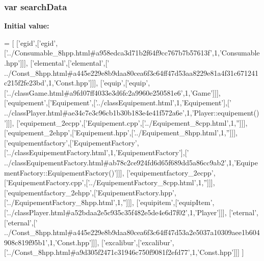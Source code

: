 \subsubsection[{search\-Data}]{\setlength{\rightskip}{0pt plus 5cm}var search\-Data}\label{all__5_8js_ad01a7523f103d6242ef9b0451861231e}
{\bfseries Initial value\-:}
\begin{DoxyCode}
=
[
  [\textcolor{stringliteral}{'egid'},[\textcolor{stringliteral}{'egid'},[\textcolor{stringliteral}{'../Consumable\_8hpp.html#a958edca3d71b2f64f9cc767b7b57613f'},1,\textcolor{stringliteral}{'Consumable.hpp'}]]],
  [\textcolor{stringliteral}{'elemental'},[\textcolor{stringliteral}{'elemental'},[\textcolor{stringliteral}{'
      ../Const\_8hpp.html#a445e229e8b9daa80cea6f3c64ff47d53aa8229e81a4f31c671241c215f2fe23bd'},1,\textcolor{stringliteral}{'Const.hpp'}]]],
  [\textcolor{stringliteral}{'equip'},[\textcolor{stringliteral}{'equip'},[\textcolor{stringliteral}{'../classGame.html#a9fd07ff4033e3d6fc2a9960e250581e6'},1,\textcolor{stringliteral}{'Game'}]]],
  [\textcolor{stringliteral}{'equipement'},[\textcolor{stringliteral}{'Equipement'},[\textcolor{stringliteral}{'../classEquipement.html'},1,\textcolor{stringliteral}{'Equipement'}],[\textcolor{stringliteral}{'
      ../classPlayer.html#ae34c7e3c96cb1b30b183e4e41f572a6e'},1,\textcolor{stringliteral}{'Player::equipement()'}]]],
  [\textcolor{stringliteral}{'equipement\_2ecpp'},[\textcolor{stringliteral}{'Equipement.cpp'},[\textcolor{stringliteral}{'../Equipement\_8cpp.html'},1,\textcolor{stringliteral}{''}]]],
  [\textcolor{stringliteral}{'equipement\_2ehpp'},[\textcolor{stringliteral}{'Equipement.hpp'},[\textcolor{stringliteral}{'../Equipement\_8hpp.html'},1,\textcolor{stringliteral}{''}]]],
  [\textcolor{stringliteral}{'equipementfactory'},[\textcolor{stringliteral}{'EquipementFactory'},[\textcolor{stringliteral}{'../classEquipementFactory.html'},1,\textcolor{stringliteral}{'EquipementFactory'}],[\textcolor{stringliteral}{'
      ../classEquipementFactory.html#ab78c2ce924fd6d65f689dd5a86cc9ab2'},1,\textcolor{stringliteral}{'EquipementFactory::EquipementFactory()'}]]],
  [\textcolor{stringliteral}{'equipementfactory\_2ecpp'},[\textcolor{stringliteral}{'EquipementFactory.cpp'},[\textcolor{stringliteral}{'../EquipementFactory\_8cpp.html'},1,\textcolor{stringliteral}{''}]]],
  [\textcolor{stringliteral}{'equipementfactory\_2ehpp'},[\textcolor{stringliteral}{'EquipementFactory.hpp'},[\textcolor{stringliteral}{'../EquipementFactory\_8hpp.html'},1,\textcolor{stringliteral}{''}]]],
  [\textcolor{stringliteral}{'equipitem'},[\textcolor{stringliteral}{'equipItem'},[\textcolor{stringliteral}{'../classPlayer.html#a52bdaa2e5c935c35f482e5de4e6d7f02'},1,\textcolor{stringliteral}{'Player'}]]],
  [\textcolor{stringliteral}{'eternal'},[\textcolor{stringliteral}{'eternal'},[\textcolor{stringliteral}{'
      ../Const\_8hpp.html#a445e229e8b9daa80cea6f3c64ff47d53a2e5037a10309aee1b604908c819f95b1'},1,\textcolor{stringliteral}{'Const.hpp'}]]],
  [\textcolor{stringliteral}{'excalibur'},[\textcolor{stringliteral}{'excalibur'},[\textcolor{stringliteral}{'../Const\_8hpp.html#a9d305f2471c31946c750f9081f2efd77'},1,\textcolor{stringliteral}{'Const.hpp'}]]]
]
\end{DoxyCode}
